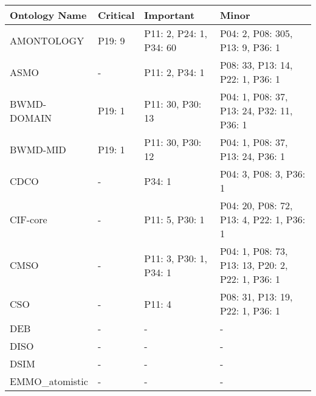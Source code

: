 \begin{tabular}{m{4cm}m{3cm}m{3cm}m{5cm}}
\toprule
          Ontology Name &       Critical &                                         Important &                                                     Minor \\
\midrule
             AMONTOLOGY &         P19: 9 &                           P11: 2, P24: 1, P34: 60 &                          P04: 2, P08: 305, P13: 9, P36: 1 \\
                   ASMO &              - &                                    P11: 2, P34: 1 &                          P08: 33, P13: 14, P22: 1, P36: 1 \\
            BWMD-DOMAIN &         P19: 1 &                                  P11: 30, P30: 13 &                 P04: 1, P08: 37, P13: 24, P32: 11, P36: 1 \\
               BWMD-MID &         P19: 1 &                                  P11: 30, P30: 12 &                          P04: 1, P08: 37, P13: 24, P36: 1 \\
                   CDCO &              - &                                            P34: 1 &                                    P04: 3, P08: 3, P36: 1 \\
               CIF-core &              - &                                    P11: 5, P30: 1 &                  P04: 20, P08: 72, P13: 4, P22: 1, P36: 1 \\
                   CMSO &              - &                            P11: 3, P30: 1, P34: 1 &          P04: 1, P08: 73, P13: 13, P20: 2, P22: 1, P36: 1 \\
                    CSO &              - &                                            P11: 4 &                          P08: 31, P13: 19, P22: 1, P36: 1 \\
                    DEB &              - &                                                 - &                                                         - \\
                   DISO &              - &                                                 - &                                                         - \\
                   DSIM &              - &                                                 - &                                                         - \\
         EMMO_atomistic &              - &                                                 - &                                                         - \\

\end{tabular}
